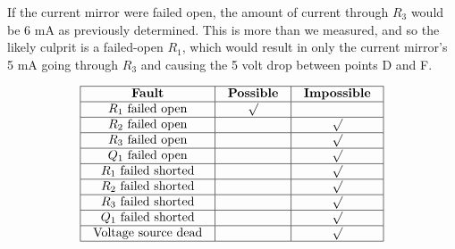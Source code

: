 If the current mirror were failed open, the amount of current through $R_3$ would be 6 mA as previously determined.  This is more than we measured, and so the likely culprit is a failed-open $R_1$, which would result in only the current mirror's 5 mA going through $R_3$ and causing the 5 volt drop between points D and F.


$$\vbox{\offinterlineskip
\halign{\strut
\vrule \quad\hfil # \ \hfil & 
\vrule \quad\hfil # \ \hfil & 
\vrule \quad\hfil # \ \hfil \vrule \cr
\noalign{\hrule}
%
{\bf Fault} & {\bf Possible} & {\bf Impossible} \cr
%
\noalign{\hrule}
%
$R_1$ failed open & $\surd$ &  \cr
%
\noalign{\hrule}
%
$R_2$ failed open &  & $\surd$ \cr
%
\noalign{\hrule}
%
$R_3$ failed open &  & $\surd$ \cr
%
\noalign{\hrule}
%
$Q_1$ failed open &  & $\surd$ \cr
%
\noalign{\hrule}
%
$R_1$ failed shorted &  & $\surd$ \cr
%
\noalign{\hrule}
%
$R_2$ failed shorted &  & $\surd$ \cr
%
\noalign{\hrule}
%
$R_3$ failed shorted &  & $\surd$ \cr
%
\noalign{\hrule}
%
$Q_1$ failed shorted &  & $\surd$ \cr
%
\noalign{\hrule}
%
Voltage source dead &  & $\surd$ \cr
%
\noalign{\hrule}
} %
}$$ %






